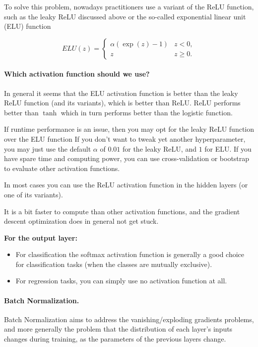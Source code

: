 To solve this problem, nowadays practitioners use a  variant of the ReLU
function, such as the leaky ReLU discussed above or the so-called
exponential linear unit (ELU) function

\[
ELU(z) = \left\{\begin{array}{cc} \alpha\left( \exp{(z)}-1\right) & z < 0,\\  z & z \ge 0.\end{array}\right. 
\]

\paragraph{Which activation function should we use?}
In general it seems that the ELU activation function is better than
the leaky ReLU function (and its variants), which is better than
ReLU. ReLU performs better than $\tanh$ which in turn performs better
than the logistic function. 

If runtime
performance is an issue, then you may opt for the  leaky ReLU function  over the 
ELU function If you don’t
want to tweak yet another hyperparameter, you may just use the default
$\alpha$ of $0.01$ for the leaky ReLU, and $1$ for ELU. If you have
spare time and computing power, you can use cross-validation or
bootstrap to evaluate other activation functions.

In most cases you can use the ReLU activation function in the hidden layers (or one of its variants).

It is a bit faster to compute than other activation functions, and the gradient descent optimization does in general not get stuck.

\textbf{For the output layer:}

\begin{itemize}
\item For classification the softmax activation function is generally a good choice for classification tasks (when the classes are mutually exclusive).

\item For regression tasks, you can simply use no activation function at all.
\end{itemize}

\noindent
\paragraph{Batch Normalization.}
Batch Normalization
aims to address the vanishing/exploding gradients problems, and more generally the problem that the
distribution of each layer’s inputs changes during training, as the parameters of the previous layers change.

